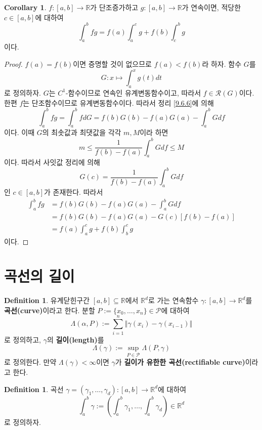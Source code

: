 \documentclass[11pt]{book}
\numberwithin{equation}{chapter}
\def\RR{\mathbb{R}}
\def\calP{\mathcal{P}}
\def\calR{\mathcal{R}}
\newcommand{\norm}[1]{\left\Vert#1\right\Vert}
\newcommand{\paren}[1]{\left(#1\right)}
\theoremstyle{definition}
\newtheorem{cor}[thm]{Corollary}
\newtheorem{defn}[thm]{Definition}
\begin{document}
\begin{cor}
    \(f : [a, b] \to \RR\)가 단조증가하고 \(g : [a, b] \to \RR\)가 연속이면, 적당한 \(c \in [a, b]\)에 대하여
    \[
        \int_a^b fg = f(a) \int_a^c g + f(b) \int_c^b g
    \]
    이다.
\end{cor}
\begin{proof}
    \(f(a) = f(b)\)이면 증명할 것이 없으므로 \(f(a) < f(b)\)라 하자. 함수 \(G\)를
    \[
        G : x \mapsto \int_a^x g(t) dt
    \]
    로 정의하자. \(G\)는 \(C^1\)-함수이므로 연속인 유계변동함수이고, 따라서 \(f \in \calR(G)\)이다. 한편 \(f\)는 단조함수이므로 유계변동함수이다. 따라서 정리 \ref{9.6.6}에 의해
    \[
        \int_a^b fg = \int_a^b fdG = f(b)G(b) - f(a)G(a) - \int_a^b G df
    \]
    이다. 이때 \(G\)의 최솟값과 최댓값을 각각 \(m, M\)이라 하면
    \[
        m \le \frac{1}{f(b) - f(a)} \int_a^b G df \le M
    \]
    이다. 따라서 사잇값 정리에 의해
    \[
        G(c) = \frac{1}{f(b) - f(a)} \int_a^b G df
    \]
    인 \(c \in [a, b]\)가 존재한다. 따라서
    \begin{align*}
        \int_a^b fg &= f(b)G(b) - f(a)G(a) - \int_a^b G df\\
        &= f(b)G(b) - f(a)G(a) - G(c)[f(b) - f(a)]\\
        &= f(a) \int_a^c g + f(b) \int_b^c g
    \end{align*}
    이다.
\end{proof}

\section{곡선의 길이}

\begin{defn}
    유계닫힌구간 \([a, b] \subseteq \RR\)에서 \(\RR^d\)로 가는 연속함수 \(\gamma : [a, b] \to \RR^d\)를 \textbf{곡선(curve)}이라고 한다. 분할 \(P := \{x_0, \ldots, x_n\} \in \calP\)에 대하여
    \[
        \Lambda(\alpha, P) := \sum_{i=1}^n \norm{\gamma(x_i) - \gamma(x_{i-1})}
    \]
    로 정의하고, \(\gamma\)의 \textbf{길이(length)}를
    \[
        \Lambda(\gamma) := \sup_{P \in \calP} \Lambda(P, \gamma)
    \]
    로 정의한다. 만약 \(\Lambda(\gamma) < \infty\)이면 \(\gamma\)가 \textbf{길이가 유한한 곡선(rectifiable curve)}이라고 한다.
\end{defn}

\begin{defn}
    곡선 \(\gamma = (\gamma_1, \ldots, \gamma_d) : [a, b] \to \RR^d\)에 대하여
    \[
        \int_a^b \gamma := \paren{\int_a^b \gamma_1, \ldots, \int_a^b \gamma_d} \in\RR^d
    \]
    로 정의하자.
\end{defn}
\end{document}
